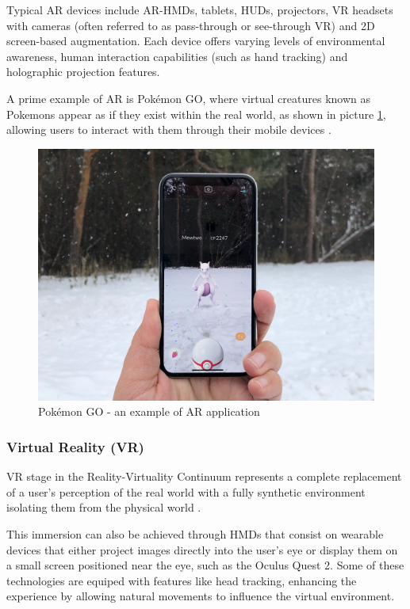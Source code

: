     Typical \ac{AR} devices include \ac{AR}-\ac{HMDs}, tablets, \ac{HUDs}, projectors, \ac{VR} headsets with cameras (often referred to as pass-through or see-through VR) and 2D screen-based augmentation. Each device offers varying levels of environmental awareness, human interaction capabilities (such as hand tracking) and holographic projection features.


    A prime example of \ac{AR} is Pokémon GO, where virtual creatures known as Pokemons appear as if they exist within the real world, as shown in picture
    \ref{f:pokemon-go}, allowing users to interact with them through their mobile devices \cite{whatismixedreality}.

    \begin{figure}[h]
        \centering
        \includegraphics[width=0.6\linewidth]{figs/mewtwo.jpg}
        \caption{Pokémon GO - an example of \ac{AR} application}
        \label{f:pokemon-go}
    \end{figure}


\subsubsection{Virtual Reality (\ac{VR})}
    
    \ac{VR} stage in the Reality-Virtuality Continuum represents a complete replacement of a user’s perception of the real world with a fully synthetic environment isolating them from the physical world \cite{milgram1994}.

    This immersion can also be achieved through \ac{HMDs} that consist on wearable devices that either project images directly into the user's eye or display them on a small screen positioned near the eye, such as the Oculus Quest 2.
    Some of these technologies are equiped with features like head tracking, enhancing the experience by allowing natural movements to influence the virtual environment.
    

